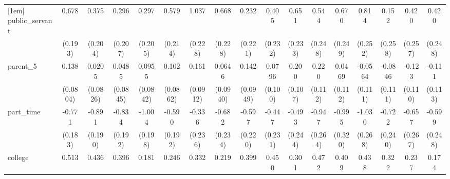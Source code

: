 {\begin{tabular}{l*{16}{c}}
[1em]
public\_servant      &       0.678\sym{***}&       0.375         &       0.296         &       0.297         &       0.579\sym{**} &       1.037\sym{***}&       0.668\sym{**} &       0.232         &       0.405         &       0.651\sym{**} &       0.544\sym{*}  &       0.670\sym{**} &       0.814\sym{**} &       0.152         &       0.420         &       0.420         \\
                    &     (0.193)         &     (0.204)         &     (0.207)         &     (0.205)         &     (0.214)         &     (0.228)         &     (0.228)         &     (0.221)         &     (0.232)         &     (0.233)         &     (0.248)         &     (0.249)         &     (0.252)         &     (0.258)         &     (0.257)         &     (0.248)         \\
[1em]
parent\_5            &       0.138         &      0.0205         &      0.0485         &      0.0955         &       0.102         &       0.161         &      0.0646         &       0.142         &      0.0796         &       0.200         &       0.220\sym{*}  &      0.0469         &     -0.0564         &     -0.0846         &      -0.123         &      -0.111         \\
                    &    (0.0804)         &    (0.0826)         &    (0.0845)         &    (0.0842)         &    (0.0862)         &    (0.0912)         &    (0.0940)         &    (0.0949)         &     (0.100)         &     (0.107)         &     (0.112)         &     (0.112)         &     (0.111)         &     (0.111)         &     (0.110)         &     (0.113)         \\
[1em]
part\_time           &      -0.771\sym{***}&      -0.891\sym{***}&      -0.834\sym{***}&      -1.004\sym{***}&      -0.590\sym{**} &      -0.336         &      -0.682\sym{**} &      -0.597\sym{**} &      -0.447         &      -0.493\sym{*}  &      -0.947\sym{***}&      -0.995\sym{**} &      -1.030\sym{***}&      -0.722\sym{**} &      -0.657\sym{*}  &      -0.599\sym{*}  \\
                    &     (0.183)         &     (0.190)         &     (0.192)         &     (0.198)         &     (0.192)         &     (0.236)         &     (0.234)         &     (0.220)         &     (0.231)         &     (0.244)         &     (0.264)         &     (0.320)         &     (0.268)         &     (0.240)         &     (0.267)         &     (0.248)         \\
[1em]
college             &       0.513\sym{***}&       0.436\sym{***}&       0.396\sym{***}&       0.181         &       0.246\sym{*}  &       0.332\sym{**} &       0.219         &       0.399\sym{**} &       0.450\sym{***}&       0.301\sym{*}  &       0.472\sym{**} &       0.409\sym{**} &       0.438\sym{**} &       0.322\sym{*}  &       0.237         &       0.174         \\

\end{tabular}}
